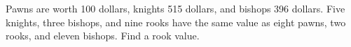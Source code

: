 Pawns are worth 100 dollars, knights 515 dollars, and bishops 396 dollars. Five knights, three bishops, and nine rooks have the same value as eight pawns, two rooks, and eleven bishops. Find a rook value.
